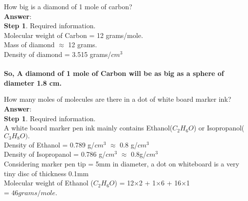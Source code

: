 \documentclass[11pt]{exam}
\begin{document}
\begin{questions}
How big is a diamond of 1 mole of carbon?\\
\textbf{Answer}: \\
\textbf{Step 1}. Required information. \\
                 Molecular weight of Carbon = 12 grams/mole. \\
                 Mass of diamond $\approx$ 12 grams. \\
                 Density of diamond = 3.515 grams/$cm^{3}$ \\ 
                                  
 \\
 
 \textbf{So, A diamond of 1 mole of Carbon will be as big as a sphere of diameter 1.8 cm.} \\ 

                    
\question
\label{Q7: A dot of ink}

How many moles of molecules are there in a dot of white board marker ink? \\
\textbf{Answer}: \\
\textbf{Step 1}. Required information. \\
A white board marker pen ink mainly contains Ethanol($C_{2}H_{6}O$) or Isopropanol($C_{3}H_{8}O).$ \\
Density of Ethanol = 0.789 g/$cm^{3}$ $\approx$ 0.8 g/$cm^{3}$\\
Density of Isopropanol = 0.786 g/$cm^{3}$ $\approx$ 0.8g/$cm^{3}$\\
Considering marker pen tip = 5mm in diameter, a dot on whiteboard is a very tiny disc of thickness 0.1mm\\
Molecular weight of Ethanol ($C_{2}H_{6}O$) = 12$\times$2 + 1$\times$6 + 16$\times$1 \\
 = $46 grams/mole.$ \\ 


\end{questions}
\end{document}
